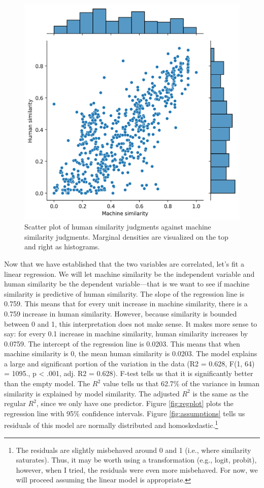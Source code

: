 \documentclass[man]{apa7}
\begin{document}
\begin{figure}
    \centering
    \includegraphics[width=\textwidth]{figures/jointplot.png}
    \caption{Scatter plot of human similarity judgments against machine similarity judgments. Marginal densities are visualized on the top and right as histograms.}
    \label{fig:jointplot}
\end{figure}

Now that we have established that the two variables are correlated, let's fit a linear regression. We will let machine similarity be the independent variable and human similarity be the dependent variable---that is we want to see if machine similarity is predictive of human similarity. The slope of the regression line is 0.759. This means that for every unit increase in machine similarity, there is a 0.759 increase in human similarity. However, because similarity is bounded between 0 and 1, this interpretation does not make sense. It makes more sense to say: for every 0.1 increase in machine similarity, human similarity increases by 0.0759. The intercept of the regression line is 0.0203. This means that when machine similarity is 0, the mean human similarity is 0.0203. The model explains a large and significant portion of the variation in the data (R2 = 0.628, F(1, 64) = 1095., p < .001, adj. R2 = 0.628). F-test tells us that it is significantly better than the empty model. The $R^2$ value tells us that 62.7\% of the variance in human similarity is explained by model similarity. The adjusted $R^2$ is the same as the regular $R^2$, since we only have one predictor. Figure \ref{fig:regplot} plots the regression line with 95\% confidence intervals. Figure \ref{fig:assumptions} tells us residuals of this model are normally distributed and homoskedastic.\footnote{The residuals are slightly misbehaved around 0 and 1 (i.e., where similarity saturates). Thus, it may be worth using a transformation (e.g., logit, probit), however, when I tried, the residuals were even more misbehaved. For now, we will proceed assuming the linear model is appropriate.}
\end{document}
